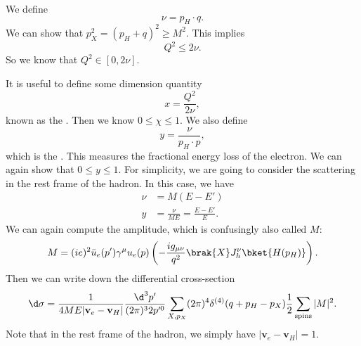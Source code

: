 \documentclass[a4paper]{article}
\begin{document}
We define
\[
  \nu = p_H \cdot q.
\]
We can show that $p_X^2 = (p_H + q)^2 \geq M^2$. This implies
\[
  Q^2 \leq 2 \nu.
\]
So we know that $Q^2 \in [0, 2 \nu]$.

It is useful to define some dimension quantity
\[
  x = \frac{Q^2}{2 \nu},
\]
known as the . Then we know $0 \leq \chi \leq 1$. We also define
\[
  y = \frac{\nu}{p_H \cdot p},
\]
which is the . This measures the fractional energy loss of the electron. We can again show that $0 \leq y \leq 1$. For simplicity, we are going to consider the scattering in the rest frame of the hadron. In this case, we have
\begin{align*}
  \nu &= M(E - E')\\
  y &= \frac{\nu}{ME} = \frac{E - E'}{E}.
\end{align*}
We can again compute the amplitude, which is confusingly also called $M$:
\[
  M = (ie)^2 \bar{u}_e (p') \gamma^\mu u_e (p) \left(-\frac{i g_{\mu\nu}}{q^2} \brak{X} J_h^\nu \bket{H(p_H)}\right).
\]
Then we can write down the differential cross-section
\[
  \d \sigma = \frac{1}{4 ME |\mathbf{v}_e - \mathbf{v}_H|} \frac{\d^3 p'}{(2\pi)^3 2 p'^0} \sum_{X, p_X} (2\pi)^4 \delta^{(4)} (q + p_H - p_X) \frac{1}{2} \sum_{\mathrm{spins}} |M|^2.
\]
Note that in the rest frame of the hadron, we simply have $|\mathbf{v}_e - \mathbf{v}_H| = 1$.
\end{document}
